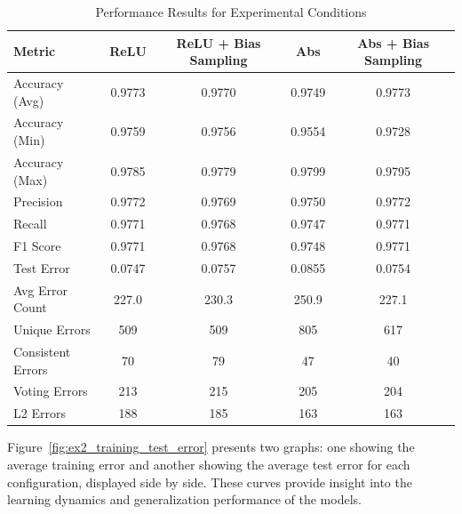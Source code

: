 \begin{table}[h]
    \centering
    \caption{Performance Results for Experimental Conditions}
    \label{tab:ex2_results_table}
    \begin{tabular}{l|c|c|c|c}
    \hline
    Metric & ReLU & ReLU + Bias Sampling & Abs & Abs + Bias Sampling \\
    \hline
    Accuracy (Avg) & 0.9773 & 0.9770 & 0.9749 & 0.9773 \\
    Accuracy (Min) & 0.9759 & 0.9756 & 0.9554 & 0.9728 \\
    Accuracy (Max) & 0.9785 & 0.9779 & 0.9799 & 0.9795 \\
    Precision & 0.9772 & 0.9769 & 0.9750 & 0.9772 \\
    Recall & 0.9771 & 0.9768 & 0.9747 & 0.9771 \\
    F1 Score & 0.9771 & 0.9768 & 0.9748 & 0.9771 \\
    Test Error & 0.0747 & 0.0757 & 0.0855 & 0.0754 \\
    Avg Error Count & 227.0 & 230.3 & 250.9 & 227.1 \\
    Unique Errors & 509 & 509 & 805 & 617 \\
    Consistent Errors & 70 & 79 & 47 & 40 \\
    Voting Errors & 213 & 215 & 205 & 204 \\
    L2 Errors & 188 & 185 & 163 & 163 \\
    \hline
    \end{tabular}
    \end{table}
    
Figure~\ref{fig:ex2_training_test_error} presents two graphs: one showing the average training error and another showing the average test error for each configuration, displayed side by side. These curves provide insight into the learning dynamics and generalization performance of the models.


